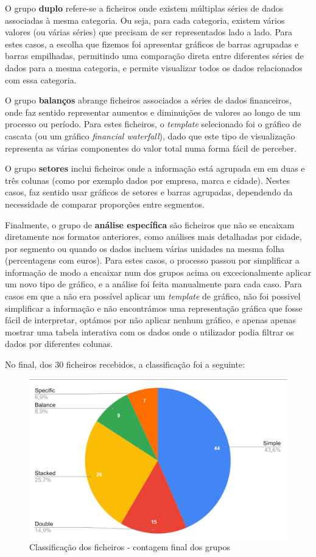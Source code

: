 O grupo \textbf{duplo} refere-se a ficheiros onde existem múltiplas séries de dados associadas à mesma categoria. Ou seja, para cada categoria, existem vários valores (ou várias séries) que precisam de ser representados lado a lado. Para estes casos, a escolha que fizemos foi apresentar gráficos de barras agrupadas e barras empilhadas, permitindo uma comparação direta entre diferentes séries de dados para a mesma categoria, e permite visualizar todos os dados relacionados com essa categoria.

O grupo \textbf{balanços} abrange ficheiros associados a séries de dados financeiros, onde faz sentido representar aumentos e diminuições de valores ao longo de um processo ou período. Para estes ficheiros, o \textit{template} selecionado foi o gráfico de cascata (ou um gráfico \textit{financial waterfall}), dado que este tipo de visualização representa as várias componentes do valor total numa forma fácil de perceber.

O grupo \textbf{setores} inclui ficheiros onde a informação está agrupada em em duas e três colunas (como por exemplo dados por empresa, marca e cidade). Nestes casos, faz sentido usar gráficos de setores e barras agrupadas,  dependendo da necessidade de comparar proporções entre segmentos.

Finalmente, o grupo de \textbf{análise específica} são ficheiros que não se encaixam diretamente nos formatos anteriores, como análises mais detalhadas por cidade, por segmento ou quando os dados incluem várias unidades na mesma folha (percentagens com euros). Para estes casos, o processo passou por simplificar a informação de modo a encaixar num dos grupos acima ou excecionalmente aplicar um novo tipo de gráfico, e a análise foi feita manualmente para cada caso. Para casos em que a não era possível aplicar um \textit{template} de gráfico, não foi possivel simplificar a informação e não encontrámos uma representação gráfica que fosse fácil de interpretar, optámos por não aplicar nenhum gráfico, e apenas apenas mostrar uma tabela interativa com os dados onde o utilizador podia filtrar os dados por diferentes colunas.

No final, dos 30 ficheiros recebidos, a classificação foi a seguinte:

\begin{figure}[h]
    \centering
    \includegraphics[max width=\textwidth]{./img/stats1}
 \caption{Classificação dos ficheiros - contagem final dos grupos}
 \end{figure}

